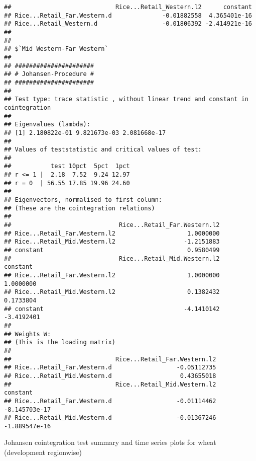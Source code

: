 \documentclass[12pt,]{article}
\begin{document}
\begin{verbatim}
##                             Rice...Retail_Western.l2      constant
## Rice...Retail_Far.Western.d              -0.01882558  4.365401e-16
## Rice...Retail_Western.d                  -0.01806392 -2.414921e-16
## 
## 
## $`Mid Western-Far Western`
## 
## ###################### 
## # Johansen-Procedure # 
## ###################### 
## 
## Test type: trace statistic , without linear trend and constant in cointegration 
## 
## Eigenvalues (lambda):
## [1] 2.180822e-01 9.821673e-03 2.081668e-17
## 
## Values of teststatistic and critical values of test:
## 
##           test 10pct  5pct  1pct
## r <= 1 |  2.18  7.52  9.24 12.97
## r = 0  | 56.55 17.85 19.96 24.60
## 
## Eigenvectors, normalised to first column:
## (These are the cointegration relations)
## 
##                              Rice...Retail_Far.Western.l2
## Rice...Retail_Far.Western.l2                    1.0000000
## Rice...Retail_Mid.Western.l2                   -1.2151883
## constant                                        0.9580499
##                              Rice...Retail_Mid.Western.l2   constant
## Rice...Retail_Far.Western.l2                    1.0000000  1.0000000
## Rice...Retail_Mid.Western.l2                    0.1382432  0.1733804
## constant                                       -4.1410142 -3.4192401
## 
## Weights W:
## (This is the loading matrix)
## 
##                             Rice...Retail_Far.Western.l2
## Rice...Retail_Far.Western.d                  -0.05112735
## Rice...Retail_Mid.Western.d                   0.43655018
##                             Rice...Retail_Mid.Western.l2      constant
## Rice...Retail_Far.Western.d                  -0.01114462 -8.145703e-17
## Rice...Retail_Mid.Western.d                  -0.01367246 -1.889547e-16
\end{verbatim}

Johansen cointegration test summary and time series plots for wheat (development regionwise)
\end{document}
